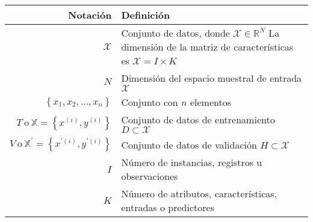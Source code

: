 \begin{table}[H]
    \begin{center}
        \begin{tabularx}{\textwidth}{|r|X|}
            \hline
            \textbf{Notación}                                                                & \textbf{Definición}                                                                                                                                                             \\
            \hline %
            $ \mathcal{X} $                                                                  & Conjunto de datos, donde $\mathcal{X} \in \mathbb{R}^{N}$\newline{} La dimensión de la matriz de características es ${\mathcal{X} = I \times K}$                                \\
            $ N $                                                                            & Dimensión del espacio muestral de entrada $\mathcal{X}$                                                                                                                         \\
            $ \left\{x_{1}, x_{2}, \ldots ,x_{n}\right\} $                                   & Conjunto con $n$ elementos                                                                                                                                                      \\
            ${T~\text{o}~\mathbb{X} = \left\{x^{(i)}, y^{(i)}\right\}}$                      & Conjunto de datos de entrenamiento ${D \subset \mathcal{X}}$                                                                                                                    \\
            ${V~\text{o}~\mathbb{X}^{\prime} = \left\{x^{\prime(i)}, y^{\prime(i)}\right\}}$ & Conjunto de datos de validación ${H \subset \mathcal{X}}$                                                                                                                       \\
            $ I $                                                                            & Número de instancias, registros u observaciones                                                                                                                                 \\
            $ K $                                                                            & Número de atributos, características, entradas o predictores                                                                                                                    \\

\end{tabularx}
\end{center}
\end{table}
